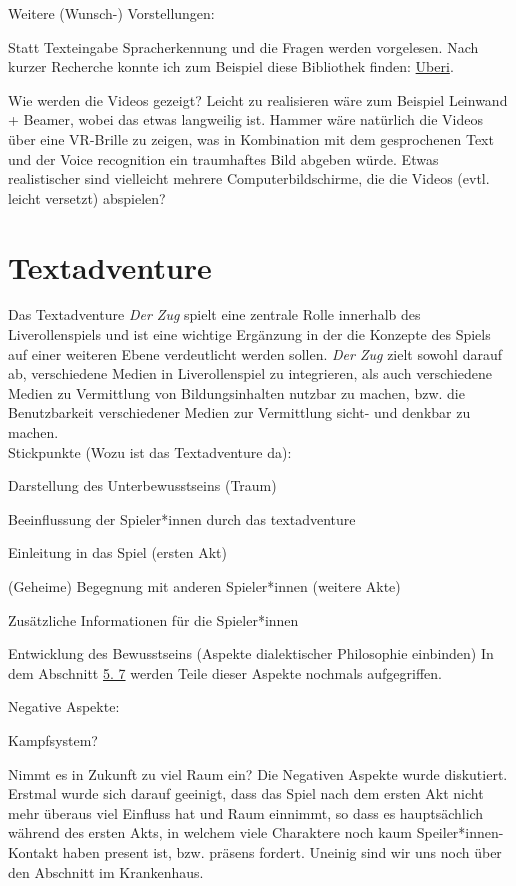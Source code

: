 \documentclass[12pt, a4paper, openany]{report}
\let\tempone\itemize
\let\temptwo\enditemize
\renewenvironment{itemize}{\tempone\addtolength{\itemsep}{-0.5\baselineskip}}{\temptwo}
\begin{document}
Weitere (Wunsch-) Vorstellungen:
\begin{itemize}
\item Statt Texteingabe Spracherkennung und die Fragen werden vorgelesen.
    Nach kurzer Recherche konnte ich zum Beispiel diese Bibliothek finden: \href{https://github.com/Uberi/speech_recognition}{Uberi}. 
\item Wie werden die Videos gezeigt? 
    Leicht zu realisieren wäre zum Beispiel Leinwand + Beamer, wobei das etwas langweilig ist. 
    Hammer wäre natürlich die Videos über eine VR-Brille zu zeigen, was in Kombination mit dem gesprochenen Text und der Voice recognition ein \glqq traumhaftes\grqq{} Bild abgeben würde.
    Etwas realistischer sind vielleicht mehrere Computerbildschirme, die die Videos (evtl. leicht versetzt) abspielen? 
\end{itemize}

\chapter{Textadventure} \label{textadventure} 
Das Textadventure \textit{Der Zug} spielt eine zentrale Rolle innerhalb des Liverollenspiels und ist eine wichtige Ergänzung in der die Konzepte des Spiels auf einer weiteren Ebene verdeutlicht werden sollen. 
\textit{Der Zug} zielt sowohl darauf ab, verschiedene Medien in Liverollenspiel zu integrieren, als auch verschiedene Medien zu Vermittlung von Bildungsinhalten nutzbar zu machen, bzw. die Benutzbarkeit verschiedener Medien zur Vermittlung sicht- und denkbar zu machen.\\
Stickpunkte (Wozu ist das Textadventure da):
\begin{itemize}
\item Darstellung des Unterbewusstseins (Traum)
\item Beeinflussung der Spieler*innen durch das textadventure
\item Einleitung in das Spiel (ersten Akt)
\item (Geheime) Begegnung mit anderen Spieler*innen (weitere Akte)
\item Zusätzliche Informationen für die Spieler*innen
\item Entwicklung des Bewusstseins (Aspekte dialektischer Philosophie einbinden)
\end{itemize}
In dem Abschnitt \hyperref[txtad-anlehnung]{5. 7} werden Teile dieser Aspekte nochmals aufgegriffen.

Negative Aspekte:
\begin{itemize}
\item Kampfsystem?
\item Nimmt es in Zukunft zu viel Raum ein? 
\end{itemize}
Die Negativen Aspekte wurde diskutiert.
Erstmal wurde sich darauf geeinigt, dass das Spiel nach dem ersten Akt nicht mehr überaus viel Einfluss hat und Raum einnimmt, so dass es hauptsächlich während des ersten Akts, in welchem viele Charaktere noch kaum Speiler*innen-Kontakt haben present ist, bzw. präsens fordert.
Uneinig sind wir uns noch über den Abschnitt im Krankenhaus.\\
\end{document}
